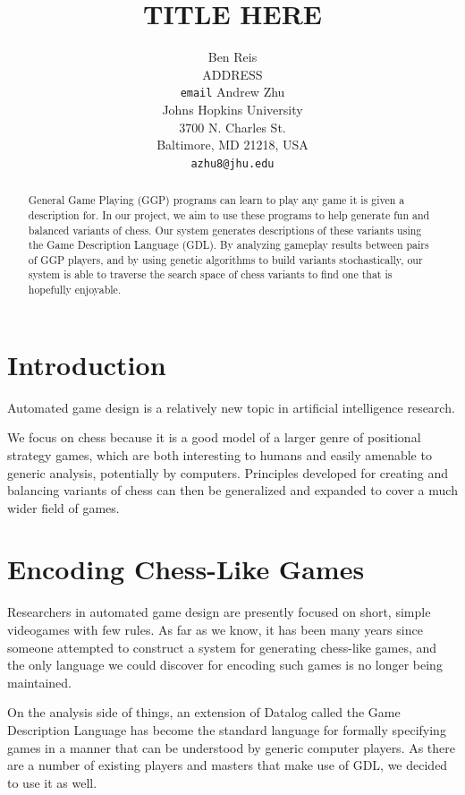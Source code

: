 \documentclass[11pt,letterpaper]{article}
\title{TITLE HERE}
\author{Ben Reis \\
  ADDRESS \\
  {\tt email}
  \And
  Andrew Zhu \\
  Johns Hopkins University \\
  3700 N. Charles St. \\
  Baltimore, MD 21218, USA\\
  {\tt azhu8@jhu.edu}}
\date{}
\begin{document}
\maketitle
\begin{abstract}
General Game Playing (GGP) programs can learn to play any game it is given a description for. In our project, we aim to use these programs to help generate fun and balanced variants of chess. Our system generates descriptions of these variants using the Game Description Language (GDL). By analyzing gameplay results between pairs of GGP players, and by using genetic algorithms to build variants stochastically, our system is able to traverse the search space of chess variants to find one that is hopefully enjoyable.
\end{abstract}

\section{Introduction}
Automated game design is a relatively new topic in artificial intelligence
research. %


We focus on chess because it is a good model of a larger genre of positional
strategy games, which are both interesting to humans and easily amenable to
generic analysis, potentially by computers. Principles developed for creating
and balancing variants of chess can then be generalized and expanded to cover
a much wider field of games.

\section{Encoding Chess-Like Games}
Researchers in automated game design are presently focused on short, simple
videogames with few rules. As far as we know, it has been many years since
someone attempted to construct a system for generating chess-like games, and the
only language we could discover for encoding such games is no longer being
maintained.

On the analysis side of things, an extension of Datalog called the Game
Description Language has become the standard language for formally specifying
games in a manner that can be understood by generic computer players. As there
are a number of existing players and masters that make use of GDL, we decided to
use it as well.
\end{document}
